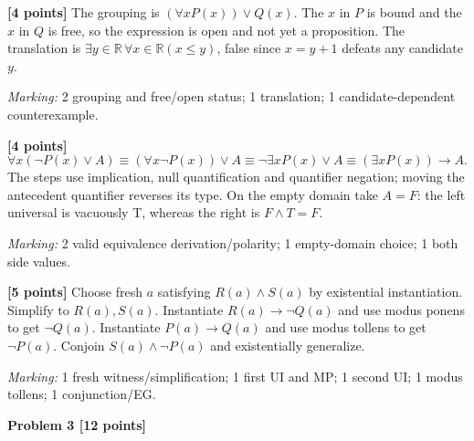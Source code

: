 \documentclass[12pt,letterpaper]{article}
\newcommand{\problemheading}[2][5\baselineskip]{\Needspace{#1}\par\noindent\hspace*{-0.625in}\textbf{#2}\par\nobreak\vspace{0.3em}}
\begin{document}
\begin{description}[font=\normalfont,leftmargin=1.2em,labelsep=0.4em]
\item[(a)] \textbf{[4 points]} The grouping is $(\forall xP(x))\lor Q(x)$. The $x$ in $P$ is bound and the $x$ in $Q$ is free, so the expression is open and not yet a proposition. The translation is $\exists y\in\mathbb R\,\forall x\in\mathbb R(x\le y)$, false since $x=y+1$ defeats any candidate $y$.
\par\textit{Marking:} 2 grouping and free/open status; 1 translation; 1 candidate-dependent counterexample.
\item[(b)] \textbf{[4 points]} \[\forall x(\neg P(x)\lor A)\equiv(\forall x\neg P(x))\lor A\equiv\neg\exists xP(x)\lor A\equiv(\exists xP(x))\to A.\] The steps use implication, null quantification and quantifier negation; moving the antecedent quantifier reverses its type. On the empty domain take $A=F$: the left universal is vacuously T, whereas the right is $F\land T=F$.
\par\textit{Marking:} 2 valid equivalence derivation/polarity; 1 empty-domain choice; 1 both side values.
\item[(c)] \textbf{[5 points]} Choose fresh $a$ satisfying $R(a)\land S(a)$ by existential instantiation. Simplify to $R(a),S(a)$. Instantiate $R(a)\to\neg Q(a)$ and use modus ponens to get $\neg Q(a)$. Instantiate $P(a)\to Q(a)$ and use modus tollens to get $\neg P(a)$. Conjoin $S(a)\land\neg P(a)$ and existentially generalize.
\par\textit{Marking:} 1 fresh witness/simplification; 1 first UI and MP; 1 second UI; 1 modus tollens; 1 conjunction/EG.
\end{description}
\vspace{0.65em}
\problemheading[\dimexpr 3\baselineskip+4\baselineskip\relax]{Problem 3 [12 points]}
\end{document}
